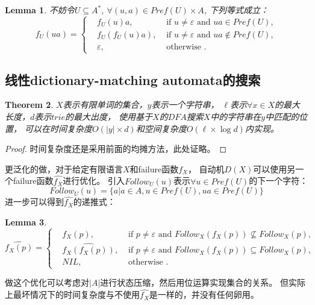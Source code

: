 \documentclass[UTF8]{ctexart}
\newtheorem{thm}{Theorem}[subsection]
\newtheorem{lem}[thm]{Lemma}
\theoremstyle{definition}
\theoremstyle{remark}
\numberwithin{equation}{subsection}
\begin{document}
	\begin{lem}
		不妨令$U \subseteq A^*$, $\forall (u,a) \in Pref(U) \times A$, 下列等式成立：
		\[
			f_U(ua) =
			\left\{
				\begin{aligned}
					&f_U(u)a, 		&\text{ if } u \neq \varepsilon \text{ and } ua \in Pref(U),       \\
					&f_U(f_U(u)a), 	&\text{ if } u \neq \varepsilon \text{ and } ua \notin Pref(U),    \\
					&\varepsilon,	&\text{ otherwise }.
				\end{aligned}
			\right .
		\]
	\end{lem}
	
\subsection{线性dictionary-matching automata的搜索}

	\begin{thm}
	\label{thm:ac_automata_complex}
		$X$表示有限单词的集合，$y$表示一个字符串，
		$\ell$表示$\forall x \in X$的最大长度，$d$表示$trie$的最大出度，
		使用基于$X$的$DFA$搜索$X$中的字符串在$y$中匹配的位置，
		可以在时间复杂度$O(|y| \times d)$和空间复杂度$O(\ell \times \log d)$内实现。
	\end{thm}
	\begin{proof}
		时间复杂度还是采用前面的均摊方法，此处证略。
	\end{proof}
	
	更泛化的做，对于给定有限语言$X$和failure函数$f_X$，
	自动机$D(X)$可以使用另一个failure函数$\hat{f_X}$进行优化。
	引入$Follow_U(u)$表示$\forall u \in Pref(U)$的下一个字符：
	\[
		Follow_U(u) = \{a | a \in A, u \in Pref(U), ua \in Pref(U) \}
	\]
	进一步可以得到$\hat{f_X}$的递推式：
	\begin{lem}
		\[
			\hat{f_X(p)} =
			\left\{
				\begin{aligned}
					&f_X(p),			&\text{ if } p \neq \varepsilon \text{ and } Follow_X(f_X(p)) \nsubseteq Follow_X(p),   \\
					&\hat{f_X(f_X(p))},	&\text{ if } p \neq \varepsilon \text{ and } Follow_X(f_X(p)) \subseteq Follow_X(p),    \\
					&NIL,				&\text{ otherwise }.
				\end{aligned}
			\right .
		\]
	\end{lem}
	做这个优化可以考虑对$|A|$进行状态压缩，然后用位运算实现集合的关系。
	但实际上最坏情况下的时间复杂度与不使用$\hat{f_X}$是一样的，并没有任何卵用。
	
\end{document}
